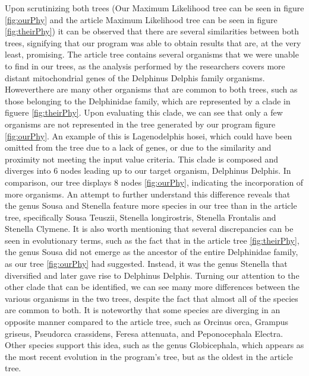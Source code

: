 \documentclass[12pt]{article}
\begin{document}
Upon scrutinizing both trees (Our Maximum Likelihood tree can be seen in figure \ref{fig:ourPhy} and the article Maximum Likelihood tree can be seen in figure \ref{fig:theirPhy}) it can be observed that there are several similarities between both trees, signifying that our program was able to obtain results that are, at the very least, promising. The article tree contains several organisms that we were unable to find in our trees, as the analysis performed by the researchers covers more distant mitochondrial genes of the Delphinus Delphis family organisms. Howeverthere are many other organisms that are common to both trees, such as those belonging to the Delphinidae family, which are represented by a clade in figuere \ref{fig:theirPhy}. Upon evaluating this clade, we can see that only a few organisms are not represented in the tree generated by our program figure \ref{fig:ourPhy}. An example of this is Lagenodelphis hosei, which could have been omitted from the tree due to a lack of genes, or due to the similarity and proximity not meeting the input value criteria. This clade is composed and diverges into 6 nodes leading up to our target organism, Delphinus Delphis. In comparison, our tree displays 8 nodes \ref{fig:ourPhy}, indicating the incorporation of more organisms. An attempt to further understand this difference reveals that the genus Sousa and Stenella feature more species in our tree than in the article tree, specifically Sousa Teuszii, Stenella longirostris, Stenella Frontalis and Stenella Clymene.\newline
It is also worth mentioning that several discrepancies can be seen in evolutionary terms, such as the fact that in the article tree \ref{fig:theirPhy}, the genus Sousa did not emerge as the ancestor of the entire Delphinidae family, as our tree \ref{fig:ourPhy} had suggested. Instead, it was the genus Stenella that diversified and later gave rise to Delphinus Delphis.\newline
Turning our attention to the other clade that can be identified, we can see many more
differences between the various organisms in the two trees, despite the fact that almost
all of the species are common to both. It is noteworthy that some species are diverging in an opposite manner compared to the article tree, such as Orcinus orca, Grampus griseus, Pseudorca crassidens, Feresa attenuata, and Peponocephala Electra.\newline
Other species support this idea, such as the genus Globicephala, which appears as the most recent evolution in the program's tree, but as the oldest in the article tree.
\end{document}
